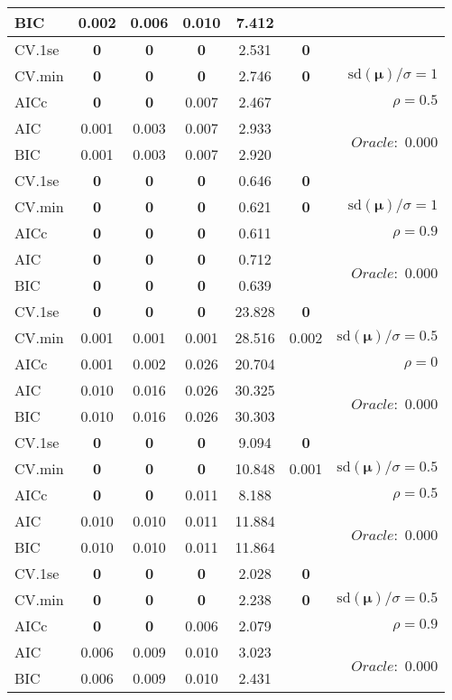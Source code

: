 \begin{table}
\begin{center}
\begin{tabular}{l*{5}{c}|r}
BIC & 0.002 & 0.006 & 0.010 & 7.412 & &  \\
 \hline 
CV.1se & {\bf 0} & {\bf 0} & {\bf 0} & 2.531 & {\bf 0} & \\
CV.min & {\bf 0} & {\bf 0} & {\bf 0} & 2.746 & {\bf 0} &  $\mathrm{sd}(\mathbf{\mu})/\sigma=1$ \\
AICc & {\bf 0} & {\bf 0} & 0.007 & 2.467 & & $\rho=0.5$ \\
AIC & 0.001 & 0.003 & 0.007 & 2.933 & &  \multirow{2}{*}{$Oracle: $ 0.000} \\
BIC & 0.001 & 0.003 & 0.007 & 2.920 & &  \\
 \hline 
CV.1se & {\bf 0} & {\bf 0} & {\bf 0} & 0.646 & {\bf 0} & \\
CV.min & {\bf 0} & {\bf 0} & {\bf 0} & 0.621 & {\bf 0} &  $\mathrm{sd}(\mathbf{\mu})/\sigma=1$ \\
AICc & {\bf 0} & {\bf 0} & {\bf 0} & 0.611 & & $\rho=0.9$ \\
AIC & {\bf 0} & {\bf 0} & {\bf 0} & 0.712 & &  \multirow{2}{*}{$Oracle: $ 0.000} \\
BIC & {\bf 0} & {\bf 0} & {\bf 0} & 0.639 & &  \\
 \hline 
CV.1se & {\bf 0} & {\bf 0} & {\bf 0} & 23.828 & {\bf 0} & \\
CV.min & 0.001 & 0.001 & 0.001 & 28.516 & 0.002 &  $\mathrm{sd}(\mathbf{\mu})/\sigma=0.5$ \\
AICc & 0.001 & 0.002 & 0.026 & 20.704 & & $\rho=0$ \\
AIC & 0.010 & 0.016 & 0.026 & 30.325 & &  \multirow{2}{*}{$Oracle: $ 0.000} \\
BIC & 0.010 & 0.016 & 0.026 & 30.303 & &  \\
 \hline 
CV.1se & {\bf 0} & {\bf 0} & {\bf 0} & 9.094 & {\bf 0} & \\
CV.min & {\bf 0} & {\bf 0} & {\bf 0} & 10.848 & 0.001 &  $\mathrm{sd}(\mathbf{\mu})/\sigma=0.5$ \\
AICc & {\bf 0} & {\bf 0} & 0.011 & 8.188 & & $\rho=0.5$ \\
AIC & 0.010 & 0.010 & 0.011 & 11.884 & &  \multirow{2}{*}{$Oracle: $ 0.000} \\
BIC & 0.010 & 0.010 & 0.011 & 11.864 & &  \\
 \hline 
CV.1se & {\bf 0} & {\bf 0} & {\bf 0} & 2.028 & {\bf 0} & \\
CV.min & {\bf 0} & {\bf 0} & {\bf 0} & 2.238 & {\bf 0} &  $\mathrm{sd}(\mathbf{\mu})/\sigma=0.5$ \\
AICc & {\bf 0} & {\bf 0} & 0.006 & 2.079 & & $\rho=0.9$ \\
AIC & 0.006 & 0.009 & 0.010 & 3.023 & &  \multirow{2}{*}{$Oracle: $ 0.000} \\
BIC & 0.006 & 0.009 & 0.010 & 2.431 & &  \\
 \hline 
\end{tabular}
\end{center}
\vspace{-1cm}
\end{table}




